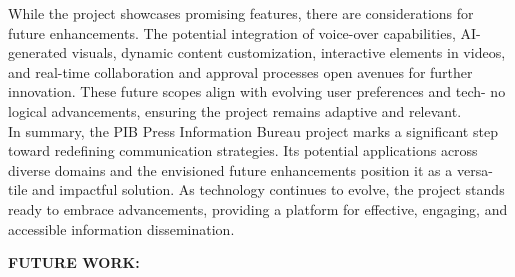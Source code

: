 \documentclass[12pt]{article}
\begin{document}
While the project showcases promising features, there are considerations for
future enhancements. The potential integration of voice-over capabilities, AI-
generated visuals, dynamic content customization, interactive elements in videos,
and real-time collaboration and approval processes open avenues for further
innovation. These future scopes align with evolving user preferences and tech-
no logical advancements, ensuring the project remains adaptive and relevant.\\

In summary, the PIB Press Information Bureau project marks a significant
step toward redefining communication strategies. Its potential applications across
diverse domains and the envisioned future enhancements position it as a versa-
tile and impactful solution. As technology continues to evolve, the project stands
ready to embrace advancements, providing a platform for effective, engaging,
and accessible information dissemination.

\pagebreak{}


\justify \textbf{\fontsize{12}{12} FUTURE WORK: }
\end{document}
